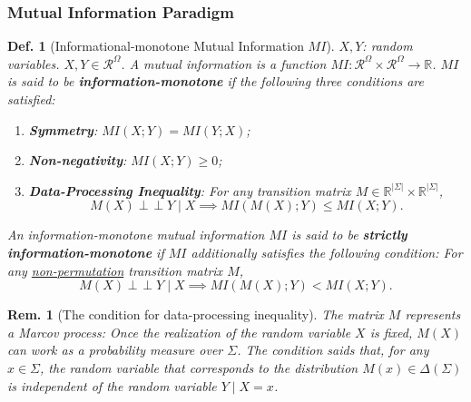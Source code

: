 \documentclass[11pt,a4paper,dvipdfmx]{article}
\theoremstyle{plain}
\newtheorem{df}{Def.}[section]
\newtheorem{rem}{Rem.}[section]
\newcommand{\R}{\mathbb{R}}
\newcommand{\mR}{\mathcal{R}}
\newcommand{\1}{\mathbbm{1}}
\newcommand{\indep}{\mathop{\perp\!\!\!\!\perp}}
\begin{document}
\subsubsection{Mutual Information Paradigm}
\begin{df}[Informational-monotone Mutual Information $MI$]
	$X,Y$: random variables. $X,Y \in  \mR^\Omega$.
	A mutual information is a function $MI: \mR^\Omega \times \mR^\Omega \to \R$. $MI$ is said to be \textbf{information-monotone} if the following three conditions are satisfied:
	\begin{enumerate}
		\item \textbf{Symmetry}: $MI(X; Y) = MI(Y; X)$;
		\item \textbf{Non-negativity}: $MI(X; Y) \geq 0$;
		\item \textbf{Data-Processing Inequality}: For any transition matrix $M \in \R^{|\Sigma|} \times \R^{|\Sigma|}$, 
		$$
		M(X) \indep Y \mid X \implies MI(M(X); Y) \leq MI(X; Y).
		$$
	\end{enumerate}
	
	An information-monotone mutual information $MI$ is said to be \textbf{strictly information-monotone} if $MI$ additionally satisfies the following condition: For any \underline{non-permutation} transition matrix $M$, 
		$$
		M(X) \indep Y \mid X \implies MI(M(X); Y) < MI(X; Y).
		$$
\end{df}

\begin{rem}[The condition for data-processing inequality]
	The matrix $M$ represents a Marcov process: Once the realization of the random variable $X$ is fixed, $M(X)$ can work as a probability measure over $\Sigma$. The condition saids that, for any $x \in \Sigma$, the random variable that corresponds to the distribution $M(x) \in \Delta(\Sigma)$ is independent of the random variable $Y \mid X = x$.
\end{rem}
\end{document}
